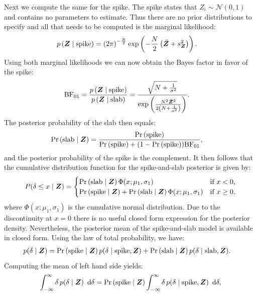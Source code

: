 \documentclass[a4paper]{article}
\newcommand{\shypo}[1]{%
	\ifnum#1>0%
		\mathrm{slab}
	\else%
		\mathrm{spike}
	\fi%
}
\newcommand{\dataZ}	{\bm{Z}}
\newcommand{\dataZi}{Z_i}
\newcommand{\meanZ}	{\bar{\dataZ}}
\newcommand{\varZ}	{s_{\dataZ}^2}
\newcommand{\probp}[1]{p\left(#1\right)}
\newcommand{\probo}{\mathrm{Pr}}
\newcommand{\prob}[1]{\probo\left(#1\right)}
\newcommand{\dnorm}[2]{\mathcal{N}\left(#1, #2\right)}
\newcommand{\dx}[1]{\enspace\mathrm{d}{#1}}
\newenvironment{revision}{\color{black}}{\color{black}}
\begin{document}
\begin{revision}
Next we compute the same for the spike. The spike states that $\dataZi\sim \dnorm{0}{1}$ and contains no parameters to estimate. Thus there are no prior distributions to specify and all that needs to be computed is the marginal likelihood:
\begin{align*}
	\probp{\dataZ\mid\shypo{0}} &= 
	\left(2\pi\right)^{-\frac{N}{2}}
	\exp\left(-\frac{N}{2}\left(\meanZ + \varZ\right)\right).
\end{align*}
Using both marginal likelihoods we can now obtain the Bayes factor in favor of the spike:
\begin{align*}
	\text{BF}_{01} &= \frac{\probp{\dataZ\mid\shypo{0}}}{\probp{\dataZ\mid\shypo{1}}} =
	\frac{
		\sqrt{N+\frac{1}{\sigma^2}}
	}{
		\exp\left(\frac{N^2 \meanZ^2}{2\left(N+\frac{1}{\sigma^2}\right)}\right)		
	}.
\end{align*}
The posterior probability of the slab then equals:
\begin{align*}
	\prob{\shypo{1}\mid \dataZ} &= \frac{\prob{\shypo{0}}}{\prob{\shypo{0}} + (1 - \prob{\shypo{0}})\text{BF}_{01}},
\end{align*}
and the posterior probability of the spike is the complement. It then follows that the cumulative distribution function for the spike-and-slab posterior is given by:
\begin{align*}
	P(\delta\leq x \mid \dataZ) =
	\begin{cases}
	\prob{\shypo{1}\mid \dataZ}\Phi(x;\mu_1,\sigma_1)	 							& \text{if $x < 0$,} \\
	\prob{\shypo{0}\mid \dataZ} + \prob{\shypo{1}\mid \dataZ}\Phi(x;\mu_1,\sigma_1)	& \text{if $x \geq 0$,}\\
	\end{cases}
\end{align*}
where $\Phi(x;\mu_1,\sigma_1)$ is the cumulative normal distribution. Due to the discontinuity at $x = 0$ there is no useful closed form expression for the posterior density. Nevertheless, the posterior mean of the spike-and-slab model is available in closed form. Using the law of total probability, we have: 
\begin{align*}
	p(\delta\mid \dataZ) &= \prob{\shypo{0}\mid \dataZ}p(\delta\mid\shypo{0}, \dataZ) + \prob{\shypo{1}\mid \dataZ}p(\delta\mid\shypo{1}, \dataZ).
\end{align*}
Computing the mean of left hand side yields:
\begin{align*}
	\int_{-\infty}^\infty \delta \, p(\delta\mid \dataZ) \dx{\delta} &= 
	\prob{\shypo{0}\mid \dataZ}\int_{-\infty}^\infty\delta \, p(\delta\mid\shypo{0}, \dataZ) \dx{\delta}, \\

\end{align*}
\end{revision}
\end{document}
